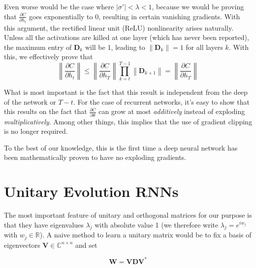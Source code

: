 \documentclass{article} %
\newcommand{\matr}[1]{\mathbf{#1}}
\newcommand\RR{\mathbb{R}}
\newcommand\norm[1]{\left\lVert#1\right\rVert}
\begin{document}
Even worse would be the case where $|\sigma'| < \lambda < 1$, because we would be proving that $\frac{\partial C}{\partial h_t}$ goes exponentially to 0, resulting in certain vanishing gradients. With this argument, the rectified linear unit (ReLU) \citep{Glorot2011} \citep{Nair2010} nonlinearity arises naturally. Unless all the activations are killed at one layer (which has never been reported), the maximum entry of $\matr{D}_k$ will be 1, leading to $\norm{\matr{D}_k} = 1$ for all layers $k$. With this, we effectively prove that
\begin{equation}
  \norm{\frac{\partial C}{\partial h_t}} \leq \norm{ \frac{\partial C}{\partial h_T}} \prod_{k=t}^{T-1} \norm{\matr{D}_{k+1}} = \norm{\frac{\partial C}{\partial h_T}}
\end{equation}

What is most important is the fact that this result is independent from the deep of the network or $T-t$. For the case of recurrent networks, it's easy to show that this results on the fact that $\frac{ \partial C}{\partial \theta}$ can grow at most {\it{additively}} instead of exploding {\it{multiplicatively}}. Among other things, this implies that the use of gradient clipping \citep{Pascanu2013} is no longer required.

To the best of our knowledge, this is the first time a deep neural network has been mathematically proven to have no exploding gradients.

%
%
%
%
%

\section{Unitary Evolution RNNs}

The most important feature of unitary and orthogonal matrices for our purpose is that they have eigenvalues $\lambda_j$ with absolute value 1 (we therefore write $\lambda_j = e^{i w_j}$ with $w_j \in \RR$). A naive method to learn a unitary matrix would be to fix a basis of eigenvectors $\matr{V} \in \mathbb{C}^{n \times n}$ and set

$$ \matr{W} = \matr{V} \matr{D} \matr{V}^{*} $$
\end{document}
